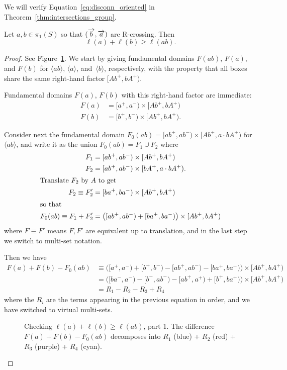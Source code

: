 We will verify Equation~\eqref{eq:disconn_oriented} in Theorem~\ref{thm:intersections_group}.

\begin{lemma}\label{lem:crossratio_disconnected_smoothing}
Let $a, b \in \pi_1(S)$ so that $(\overrightarrow{b},\overrightarrow{a})$ are R-crossing.
Then
\[
\ell(a) + \ell(b) \geq \ell(ab).
\]
\end{lemma}

\begin{proof}
See
Figure~\ref{fig:rcross_cr}. We start by giving fundamental domains $F(ab)$, $F(a)$, and $F(b)$ for $\langle ab \rangle$,
$\langle a \rangle$, and~$\langle b \rangle$, respectively, with the property that all
boxes share the same right-hand factor $[Ab^+, bA^+)$.

Fundamental domains $F(a)$, $F(b)$ with this right-hand factor are immediate:
\begin{align*}
  F(a) &= [a^+, a^-) \times [Ab^+, bA^+)\\
  F(b) &= [b^+, b^-) \times [Ab^+, bA^+).
\end{align*}

Consider next the fundamental domain $F_0(ab) = [ab^+,ab^-) \times [Ab^+, a
\cdot bA^+)$ for $\langle ab \rangle$, and write it as the union
$F_0(ab) = F_1 \cup F_2$ where
\begin{align*}
  F_1 &= [ab^+,ab^-) \times [Ab^+, bA^+) \\
  F_2 &= [ab^+,ab^-) \times [bA^+, a \cdot bA^+).
  \\\intertext{Translate $F_2$ by $A$ to get}
  F_2 \equiv F_2' &= [ba^+,ba^-) \times [Ab^+, bA^+)
  \\\intertext{so that}
  F_0(ab) \equiv F_1 + F_2' &= \bigl([ab^+,ab^-) + [ba^+,ba^-)\bigr)
                            \times [Ab^+, bA^+)
\end{align*}
where $F \equiv F'$ means $F, F'$ are equivalent up to translation, and in the last step we switch to multi-set notation.


Then we have
\begin{align*}
  F(a) + F(b) - F_0(ab)
    &\equiv \bigl([a^+,a^-) + [b^+, b^-) - [ab^+,ab^-) - [ba^+,ba^-)\bigr)
      \times [Ab^+, bA^+)\\
    &= \bigl([ba^-,a^-) - [b^-,ab^-) - [ab^+,a^+) + [b^+,ba^+)\bigr)
      \times [Ab^+, bA^+)\\
    &= R_1 - R_2 - R_3 + R_4
\end{align*}
where the $R_i$ are the terms appearing in the previous equation in
order, and we have switched to virtual multi-sets. 
\begin{figure}[ht]
     \centering
{}
    \caption{Checking $\ell(a) + \ell(b) \geq \ell(ab)$, part 1.
      The difference $F(a) + F(b) - F_0(ab)$  decomposes into $R_1$ (blue) + $R_2$
      (red) + 
      $R_3$ (purple) + $R_4$ (cyan).}\label{fig:rcross_cr}
\end{figure}


\end{proof}
